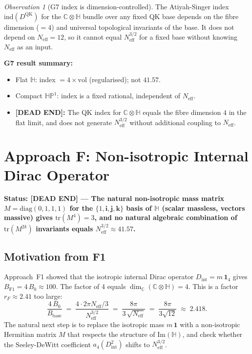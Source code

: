 \documentclass[11pt,a4paper]{article}
\theoremstyle{definition}
\theoremstyle{remark}
\newtheorem{observation}{Observation}
\begin{document}
\begin{observation}[G7 index is dimension-controlled]
  \label{obs:G7}
  The Atiyah-Singer index $\mathrm{ind}(D^{\mathrm{QK}})$ for the
  $\mathbb{C}\otimes\mathbb{H}$ bundle over any fixed QK base depends on
  the fibre dimension ($= 4$) and universal topological invariants of the base.
  It does not depend on $N_{\mathrm{eff}} = 12$, so it cannot equal
  $N_{\mathrm{eff}}^{3/2}$ for a fixed base without knowing $N_{\mathrm{eff}}$
  as an input.
\end{observation}

\textbf{G7 result summary:}
\begin{itemize}
  \item Flat $\mathbb{H}$: index $= 4 \times \mathrm{vol}$ (regularised); not $41.57$.
  \item Compact $\mathbb{HP}^1$: index is a fixed rational, independent of $N_{\mathrm{eff}}$.
  \item \textbf{[DEAD END]:} The QK index for $\mathbb{C}\otimes\mathbb{H}$
    equals the fibre dimension $4$ in the flat limit, and does not generate
    $N_{\mathrm{eff}}^{3/2}$ without additional coupling to $N_{\mathrm{eff}}$.
\end{itemize}

\section{Approach F: Non-isotropic Internal Dirac Operator}
\label{sec:F}

\textbf{Status: [DEAD END] — The natural non-isotropic mass matrix
$M = \mathrm{diag}(0,1,1,1)$ for the $\{1,\mathbf{i},\mathbf{j},\mathbf{k}\}$
basis of $\mathbb{H}$ (scalar massless, vectors massive) gives
$\mathrm{tr}(M^4) = 3$, and no natural algebraic combination of
$\mathrm{tr}(M^{2k})$ invariants equals $N_{\mathrm{eff}}^{3/2} \approx 41.57$.}

\subsection{Motivation from F1}

Approach~F1 showed that the isotropic internal Dirac operator
$D_{\mathrm{int}} = m\,\mathbf{1}_4$ gives $B_{\mathrm{F1}} = 4\,B_0 \approx 100$.
The factor of 4 equals $\dim_\mathbb{C}(\mathbb{C}\otimes\mathbb{H}) = 4$.
This is a factor $r_F \approx 2.41$ too large:
\begin{equation}
  \frac{4\,B_0}{B_{\mathrm{base}}}
  \;=\; \frac{4 \cdot 2\pi N_{\mathrm{eff}}/3}{N_{\mathrm{eff}}^{3/2}}
  \;=\; \frac{8\pi}{3\,\sqrt{N_{\mathrm{eff}}}}
  \;=\; \frac{8\pi}{3\sqrt{12}}
  \;\approx\; 2.418.
  \label{eq:ratio_F1}
\end{equation}
The natural next step is to replace the isotropic mass $m\,\mathbf{1}$ with
a non-isotropic Hermitian matrix $M$ that respects the structure of
$\mathrm{Im}(\mathbb{H})$, and check whether the Seeley-DeWitt coefficient
$a_4(D_{\mathrm{int}}^2)$ shifts to $N_{\mathrm{eff}}^{3/2}$.
\end{document}
